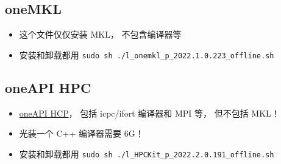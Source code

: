 \subsection{oneMKL}
\begin{itemize}
\item 这个文件仅仅安装 MKL， 不包含编译器等
\item 安装和卸载都用 \verb`sudo sh ./l_onemkl_p_2022.1.0.223_offline.sh`
\end{itemize}

\subsection{oneAPI HPC}
\begin{itemize}
\item \href{https://www.intel.com/content/www/us/en/developer/tools/oneapi/hpc-toolkit-download.html?operatingsystem=linux&distributions=offline}{oneAPI HCP}， 包括 icpc/ifort 编译器和 MPI 等， 但不包括 MKL！
\item 光装一个 C++ 编译器需要 6G！
\item 安装和卸载都用 \verb`sudo sh ./l_HPCKit_p_2022.2.0.191_offline.sh`
\end{itemize}

